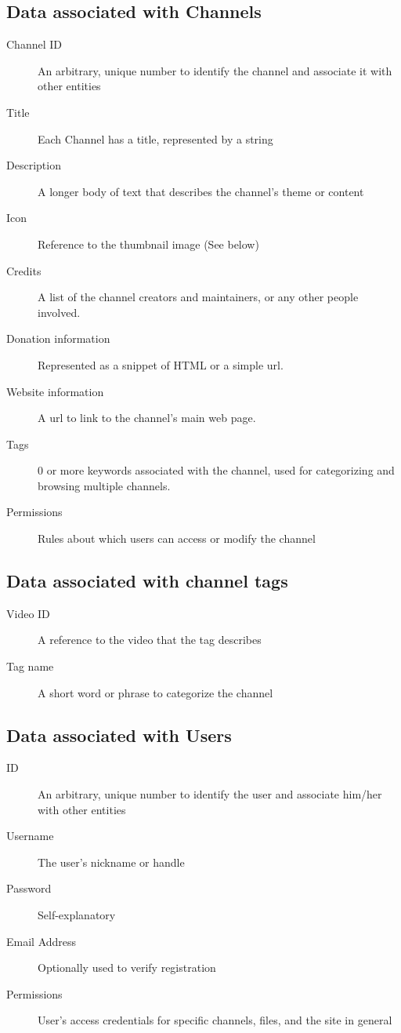 \documentclass[a4paper,12pt]{report}
\begin{document}
\subsection{Data associated with Channels}
\begin{description}
\item[Channel ID] An arbitrary, unique number to identify the channel and  associate it with other entities
\item[Title] Each Channel has a title, represented by a string
\item[Description] A longer body of text that describes the channel's theme or content
\item[Icon] Reference to the thumbnail image (See below)
\item[Credits] A list of the channel creators and maintainers, or any other people involved.
\item[Donation information] Represented as a snippet of HTML or a simple url.
\item[Website information] A url to link to the channel's main web page.
\item[Tags] 0 or more keywords associated with the channel, used for categorizing and browsing multiple channels.
\item[Permissions] Rules about which users can access or modify the channel
\end{description}

\subsection{Data associated with channel tags}
\begin{description}
\item[Video ID] A reference to the video that the tag describes
\item[Tag name] A short word or phrase to categorize the channel
\end{description}

\subsection{Data associated with Users}
\begin{description}
\item[ID] An arbitrary, unique number to identify the user and associate him/her with other entities
\item[Username] The user's nickname or handle
\item[Password] Self-explanatory
\item[Email Address] Optionally used to verify registration
\item[Permissions] User's access credentials for specific channels, files, and the site in general
\end{description}
\end{document}
